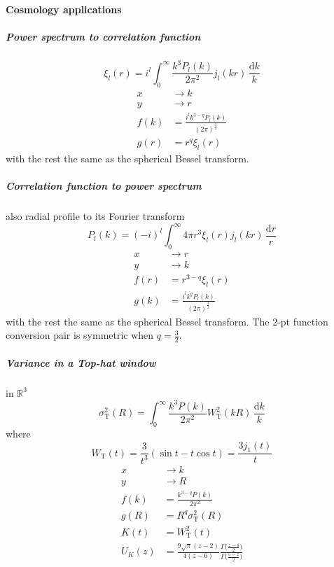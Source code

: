 \documentclass{article}
\renewcommand{\d}{\mathrm{d}}
\newcommand{\Mellin}{U}
\newcommand{\Tophat}{\mathrm{T}}
\begin{document}
\paragraph{Cosmology applications}


\subparagraph{Power spectrum to correlation function}
\begin{equation}
    \xi_l(r) = i^l \int_0^\infty \frac{k^3P_l(k)}{2\pi^2} j_l(kr) \,\frac{\d k}k
\end{equation}
\begin{align}
    x &\to k \\
    y &\to r \\
    f(k) &= \frac{i^l k^{3-q} P_l(k)}{(2\pi)^\frac32} \\
    g(r) &= r^q \xi_l(r)
\end{align}
with the rest the same as the spherical Bessel transform.


\subparagraph{Correlation function to power spectrum}
also radial profile to its Fourier transform
\begin{equation}
    P_l(k) = (-i)^l \int_0^\infty 4\pi r^3\xi_l(r) j_l(kr) \,\frac{\d r}r
\end{equation}
\begin{align}
    x &\to r \\
    y &\to k \\
    f(r) &= r^{3-q} \xi_l(r) \\
    g(k) &= \frac{i^l k^q P_l(k)}{(2\pi)^\frac32}
\end{align}
with the rest the same as the spherical Bessel transform.
The 2-pt function conversion pair is symmetric when $q=\frac32$.


\subparagraph{Variance in a Top-hat window}
in $\mathbb{R}^3$
\begin{equation}
    \sigma_\Tophat^2(R) = \int_0^\infty \frac{k^3P(k)}{2\pi^2} W_\Tophat^2(kR) \,\frac{\d k}k
\end{equation}
where
\begin{equation}
    W_\Tophat(t) = \frac3{t^3}(\sin t - t\cos t) = \frac{3j_1(t)}t
\end{equation}
\begin{align}
    x &\to k \\
    y &\to R \\
    f(k) &= \frac{k^{3-q}P(k)}{2\pi^2} \\
    g(R) &= R^q \sigma_\Tophat^2(R) \\
    K(t) &= W_\Tophat^2(t) \\
    \Mellin_K(z) &= \frac{9\sqrt{\pi}(z-2)}{4(z-6)}
        \frac{\Gamma\bigl(\frac{z-4}2\bigr)}{\Gamma\bigl(\frac{5-z}2\bigr)}
\end{align}
\end{document}
